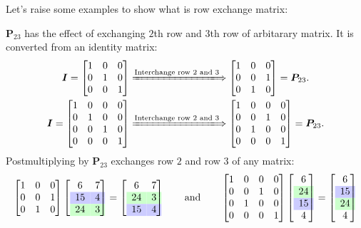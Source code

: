 Let’s raise some examples to show what is row exchange matrix:
\begin{example}
$\bm P_{23}$ has the effect of exchanging $2$th row and $3$th row of arbitarary matrix. It is converted from an identity matrix:
\begin{gather*}
\bm I=\begin{bmatrix}
1&0&0\\0&1&0\\0&0&1
\end{bmatrix}
\xLongrightarrow{\text{Interchange row $2$ and $3$}}
\begin{bmatrix}
1&0&0\\0&0&1\\0&1&0
\end{bmatrix}=\bm P_{23}.\\
\bm I=\begin{bmatrix}
1&0&0&0\\0&1&0&0\\0&0&1&0\\0&0&0&1
\end{bmatrix}
\xLongrightarrow{\text{Interchange row $2$ and $3$}}
\begin{bmatrix}
1&0&0&0\\0&0&1&0\\0&1&0&0\\0&0&0&1
\end{bmatrix}=\bm P_{23}.
\end{gather*}
Postmultiplying by $\bm P_{23}$ exchanges row $2$ and row $3$ of any matrix:
\[
\begin{bmatrix}
1&0&0\\0&0&1\\0&1&0
\end{bmatrix}
\left[
\begin{array}{cc@{}}
6&7\\
\rowcolor{blue!20}
15&4\\
\rowcolor{green!20}
24&3
\end{array}
\right]=
\left[
\begin{array}{cc@{}}
6&7\\
\rowcolor{green!20}
24&3\\
\rowcolor{blue!20}
15&4
\end{array}
\right]
\qquad\text{and}\qquad
\begin{bmatrix}
1&0&0&0\\0&0&1&0\\0&1&0&0\\0&0&0&1
\end{bmatrix}
\left[
\begin{array}{c@{}}
6\\
\rowcolor{green!20}
24\\
\rowcolor{blue!20}
15\\
4
\end{array}\right]
=\left[
\begin{array}{c@{}}
6\\
\rowcolor{blue!20}
15\\
\rowcolor{green!20}
24\\
4
\end{array}\right]
\]
\end{example}
